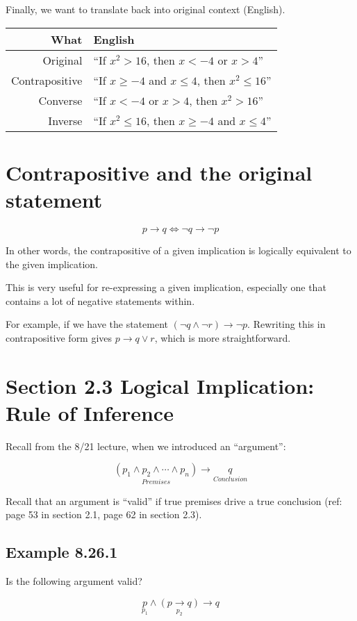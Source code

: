 \documentclass{article}
\begin{document}
Finally, we want to translate back into original context (English).

\begin{tabular}{rl}
What & English \\
\hline
Original & ``If $x^2>16$, then $x<-4$ or $x>4$'' \\
Contrapositive & ``If $x\ge-4$ and $x\le 4$, then $x^2\le 16$'' \\
Converse & ``If $x<-4$ or $x>4$, then $x^2>16$'' \\
Inverse & ``If $x^2\le 16$, then $x\ge-4$ and $x\le 4$''
\end{tabular}

\section*{Contrapositive and the original statement}

\[
p\rightarrow q\Leftrightarrow \neg q\rightarrow\neg p
\]

In other words, the contrapositive of a given implication is logically equivalent to the given implication.

This is very useful for re-expressing a given implication, especially one that contains a lot of negative statements within.

For example, if we have the statement
$(\neg{}q\wedge\neg{}r)\rightarrow\neg{}p$. Rewriting this in
contrapositive form gives $p\rightarrow{}q\vee{}r$, which is more
straightforward.

\section*{Section 2.3 Logical Implication: Rule of Inference}

Recall from the 8/21 lecture, when we introduced an ``argument'':

\[
\underset{Premises}{(p_1\wedge p_2\wedge \cdots\wedge p_n)} \rightarrow\underset{Conclusion}{q}
\]

Recall that an argument is ``valid'' if true premises drive a true
conclusion (ref: page 53 in section 2.1, page 62 in section 2.3).

\subsection*{Example 8.26.1}

Is the following argument valid?

\[
\underset{p_1}{p}\wedge\underset{p_2}{(p\rightarrow q)}\rightarrow q
\]
\end{document}
